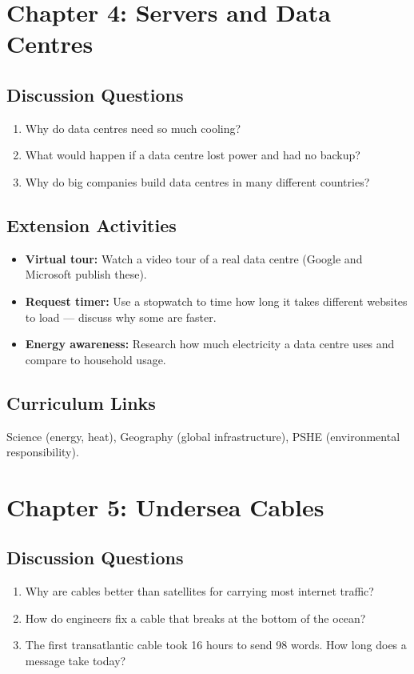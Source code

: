 \section*{Chapter 4: Servers and Data Centres}

\subsection*{Discussion Questions}
\begin{enumerate}
  \item Why do data centres need so much cooling?
  \item What would happen if a data centre lost power and had no backup?
  \item Why do big companies build data centres in many different countries?
\end{enumerate}

\subsection*{Extension Activities}
\begin{itemize}
  \item \textbf{Virtual tour:} Watch a video tour of a real data centre (Google and Microsoft publish these).
  \item \textbf{Request timer:} Use a stopwatch to time how long it takes different websites to load — discuss why some are faster.
  \item \textbf{Energy awareness:} Research how much electricity a data centre uses and compare to household usage.
\end{itemize}

\subsection*{Curriculum Links}
Science (energy, heat), Geography (global infrastructure), PSHE (environmental responsibility).

\sectionrule

\section*{Chapter 5: Undersea Cables}

\subsection*{Discussion Questions}
\begin{enumerate}
  \item Why are cables better than satellites for carrying most internet traffic?
  \item How do engineers fix a cable that breaks at the bottom of the ocean?
  \item The first transatlantic cable took 16 hours to send 98 words. How long does a message take today?
\end{enumerate}

